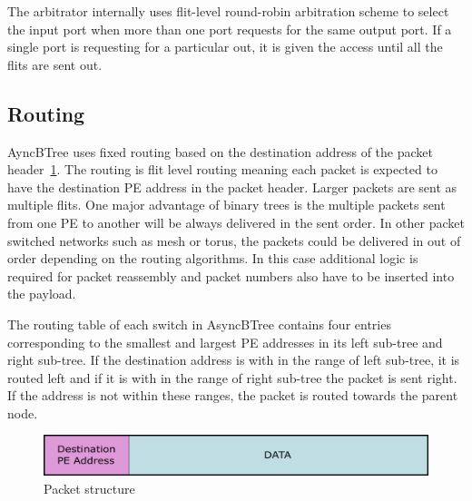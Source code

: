 The arbitrator internally uses flit-level round-robin arbitration scheme to select the input port when more than one port requests for the same output port.
If a single port is requesting for a particular out, it is given the access until all the flits are sent out.

\subsection{Routing}
\label{sec:routing}
AyncBTree uses fixed routing based on the destination address of the packet header~\ref{fig:packet}.
The routing is flit level routing meaning each packet is expected to have the destination PE address in the packet header.
Larger packets are sent as multiple flits.
One major advantage of binary trees is the multiple packets sent from one PE to another will be always delivered in the sent order.
In other packet switched networks such as mesh or torus, the packets could be delivered in out of order depending on the routing algorithms.
In this case additional logic is required for packet reassembly and packet numbers also have to be inserted into the payload.

The routing table of each switch in AsyncBTree contains four entries corresponding to the smallest and largest PE addresses in its left sub-tree and right sub-tree.
If the destination address is with in the range of left sub-tree, it is routed left and if it is with in the range of right sub-tree the packet is sent right.
If the address is not within these ranges, the packet is routed towards the parent node.

\begin{figure}[t]
\centering
   \includegraphics[width=\columnwidth]{Figures/pckt_structure.pdf}
   \caption{Packet structure}
   \label{fig:packet}
\end{figure}